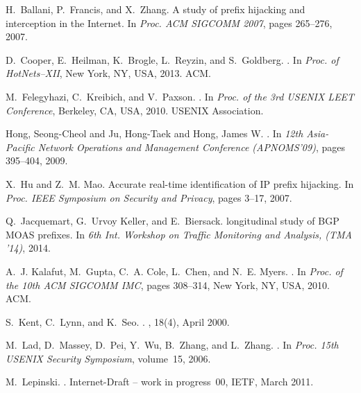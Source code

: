 \documentclass{llncs}
\begin{document}
\begin{thebibliography}{10}

H.~Ballani, P.~Francis, and X.~Zhang.
\newblock A study of prefix hijacking and interception in the {I}nternet.
\newblock In {\em Proc. ACM SIGCOMM 2007}, pages 265--276, 2007.

D.~Cooper, E.~Heilman, K.~Brogle, L.~Reyzin, and S.~Goldberg.
.
\newblock In {\em Proc. of HotNets--XII}, New York, NY, USA, 2013. ACM.

M.~Felegyhazi, C.~Kreibich, and V.~Paxson.
.
\newblock In {\em Proc. of the 3rd USENIX LEET Conference}, Berkeley, CA, USA,
  2010. USENIX Association.

{Hong, Seong-Cheol and Ju, Hong-Taek and Hong, James W.}
.
\newblock In {\em {12th Asia-Pacific Network Operations and Management
  Conference (APNOMS'09)}}, pages 395--404, 2009.

X.~Hu and Z.~M. Mao.
\newblock Accurate real-time identification of {IP} prefix hijacking.
\newblock In {\em Proc. {IEEE} Symposium on Security and Privacy}, pages 3--17,
  2007.

Q.~{J}acquemart, G.~{U}rvoy {K}eller, and E.~{B}iersack.
 longitudinal study of {BGP} {MOAS} prefixes.
\newblock In {\em 6th {I}nt. {W}orkshop on {T}raffic {M}onitoring and
  {A}nalysis, (TMA '14)}, 2014.

A.~J. Kalafut, M.~Gupta, C.~A. Cole, L.~Chen, and N.~E. Myers.
.
\newblock In {\em Proc. of the 10th ACM SIGCOMM IMC}, pages 308--314, New York,
  NY, USA, 2010. ACM.

S.~Kent, C.~Lynn, and K.~Seo.
.
, 18(4), April
  2000.

M.~Lad, D.~Massey, D.~Pei, Y.~Wu, B.~Zhang, and L.~Zhang.
.
\newblock In {\em Proc. 15th USENIX Security Symposium}, volume~15, 2006.

M.~Lepinski.
.
\newblock Internet-Draft -- work in progress~00, IETF, March 2011.


\end{thebibliography}
\end{document}
